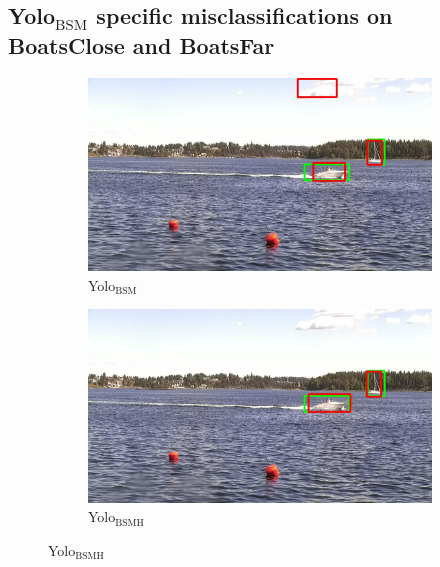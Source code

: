 \subsection{Yolo$_{\text{BSM}}$ specific misclassifications on BoatsClose and BoatsFar}
\label{sec:yolo2_spec_misc}
\begin{figure}[h!]
\begin{subfigure}{.5\textwidth}
  \centering
  \includegraphics[width=0.9\linewidth]{results/case_buildings/yolo23/grove/yolo2/selected_06_25_frame0357.jpg}
  \caption{Yolo$_{\text{BSM}}$}
\end{subfigure}%
\begin{subfigure}{.5\textwidth}
  \centering
  \includegraphics[width=.9\linewidth]{results/case_buildings/yolo23/grove/yolo3/selected_06_25_frame0357.jpg}
  \caption{Yolo$_{\text{BSMH}}$}
\end{subfigure}


\end{figure}

